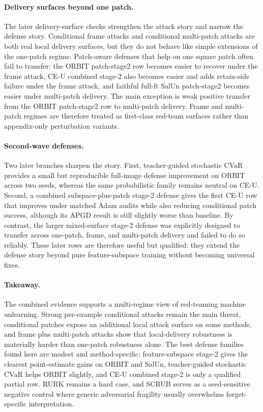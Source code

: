 \paragraph{Delivery surfaces beyond one patch.}
The later delivery-surface checks strengthen the attack story and narrow the defense story. Conditional frame attacks and conditional multi-patch attacks are both real local delivery surfaces, but they do not behave like simple extensions of the one-patch regime. Patch-aware defenses that help on one square patch often fail to transfer: the ORBIT patch-stage2 row becomes easier to recover under the frame attack, CE-U combined stage-2 also becomes easier and adds retain-side failure under the frame attack, and faithful full-ft SalUn patch-stage2 becomes easier under multi-patch delivery. The main exception is weak positive transfer from the ORBIT patch-stage2 row to multi-patch delivery. Frame and multi-patch regimes are therefore treated as first-class red-team surfaces rather than appendix-only perturbation variants.

\paragraph{Second-wave defenses.}
Two later branches sharpen the story. First, teacher-guided stochastic CVaR provides a small but reproducible full-image defense improvement on ORBIT across two seeds, whereas the same probabilistic family remains neutral on CE-U. Second, a combined subspace-plus-patch stage-2 defense gives the first CE-U row that improves under matched Adam audits while also reducing conditional patch success, although its APGD result is still slightly worse than baseline. By contrast, the larger mixed-surface stage-2 defense was explicitly designed to transfer across one-patch, frame, and multi-patch delivery and failed to do so reliably. These later rows are therefore useful but qualified: they extend the defense story beyond pure feature-subspace training without becoming universal fixes.

\paragraph{Takeaway.}
The combined evidence supports a multi-regime view of red-teaming machine unlearning. Strong per-example conditional attacks remain the main threat, conditional patches expose an additional local attack surface on some methods, and frame plus multi-patch attacks show that local-delivery robustness is materially harder than one-patch robustness alone. The best defense families found here are modest and method-specific: feature-subspace stage-2 gives the clearest point-estimate gains on ORBIT and SalUn, teacher-guided stochastic CVaR helps ORBIT slightly, and CE-U combined stage-2 is only a qualified partial row. RURK remains a hard case, and SCRUB serves as a seed-sensitive negative control where generic adversarial fragility usually overwhelms forget-specific interpretation.
